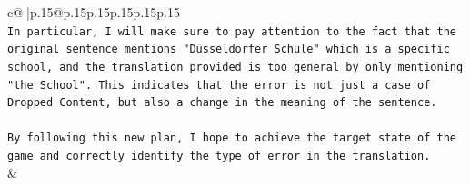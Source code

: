 \documentclass{article}
\begin{document}
{\begin{supertabular}{c@{$\;$}|p{.15\linewidth}@{}p{.15\linewidth}p{.15\linewidth}p{.15\linewidth}p{.15\linewidth}p{.15\linewidth}}
{{{\\ 
\texttt{In particular, I will make sure to pay attention to the fact that the original sentence mentions "Düsseldorfer Schule" which is a specific school, and the translation provided is too general by only mentioning "the School". This indicates that the error is not just a case of Dropped Content, but also a change in the meaning of the sentence.} \\
\\ 
\texttt{By following this new plan, I hope to achieve the target state of the game and correctly identify the type of error in the translation.} \\
            }
        }
    }
    & \\ \\

\end{supertabular}
}
\end{document}
